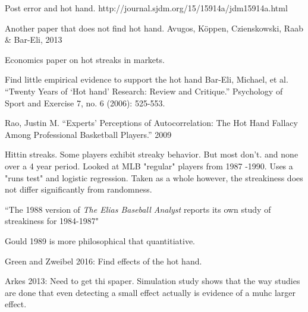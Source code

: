 \documentclass[letterpaper,12pt]{article}\usepackage[]{graphicx}\usepackage[]{color}
\begin{document}


Post error and hot hand.  http://journal.sjdm.org/15/15914a/jdm15914a.html

Another paper that does not find hot hand.  Avugos, Köppen, Czienskowski, Raab & Bar-Eli, 2013

\cite{RabinVayanos2010} Economics paper on hot streaks in markets.  

\cite{BarEliEtAl2006} Find little empirical evidence to support the hot hand 
Bar-Eli, Michael, et al. “Twenty Years of ‘Hot hand’ Research: Review and Critique.” Psychology of Sport and
Exercise 7, no. 6 (2006): 525-553.


Rao, Justin M. “Experts’ Perceptions of Autocorrelation: The Hot Hand Fallacy Among Professional Basketball
Players.” 2009

\cite{Albright1993} Hittin streaks.  Some players exhibit streaky behavior.  But most don't. and none over a 4 year period.  Looked at MLB "regular" players from 1987 -1990.  Uses a "runs test" and logistic regression.  Taken as a whole however, the streakiness does not differ significantly from randomness.  


``The 1988 version of {\em The Elias Baseball Analyst} reports its own study of streakiness for 1984-1987"

Gould 1989 is more philosophical that quantitiative.  



Green and Zweibel 2016: Find effects of the hot hand.  

Arkes 2013: Need to get thi spaper.    Simulation study shows that the way studies are done that even detecting a small effect actually is evidence of a muhc larger effect.  
\end{document}

